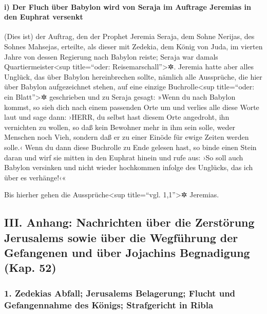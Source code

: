 \hypertarget{i-der-fluch-uxfcber-babylon-wird-von-seraja-im-auftrage-jeremias-in-den-euphrat-versenkt}{%
\paragraph{i) Der Fluch über Babylon wird von Seraja im Auftrage
Jeremias in den Euphrat
versenkt}\label{i-der-fluch-uxfcber-babylon-wird-von-seraja-im-auftrage-jeremias-in-den-euphrat-versenkt}}

(Dies ist) der Auftrag, den der Prophet Jeremia Seraja,
dem Sohne Nerijas, des Sohnes Mahsejas, erteilte, als dieser mit
Zedekia, dem König von Juda, im vierten Jahre von dessen Regierung nach
Babylon reiste; Seraja war damals Quartiermeister\textless sup
title=``oder: Reisemarschall''\textgreater✲. Jeremia
hatte aber alles Unglück, das über Babylon hereinbrechen sollte, nämlich
alle Aussprüche, die hier über Babylon aufgezeichnet stehen, auf eine
einzige Buchrolle\textless sup title=``oder: ein Blatt''\textgreater✲
geschrieben und zu Seraja gesagt: »Wenn du nach Babylon
kommst, so sieh dich nach einem passenden Orte um und verlies alle diese
Worte laut und sage dann: ›HERR, du selbst hast diesem
Orte angedroht, ihn vernichten zu wollen, so daß kein Bewohner mehr in
ihm sein solle, weder Menschen noch Vieh, sondern daß er zu einer Einöde
für ewige Zeiten werden solle.‹ Wenn du dann diese
Buchrolle zu Ende gelesen hast, so binde einen Stein daran und wirf sie
mitten in den Euphrat hinein und rufe aus: ›So soll auch
Babylon versinken und nicht wieder hochkommen infolge des Unglücks, das
ich über es verhänge!‹«

Bis hierher gehen die Aussprüche\textless sup title=``vgl.
1,1''\textgreater✲ Jeremias.

\hypertarget{iii.-anhang-nachrichten-uxfcber-die-zerstuxf6rung-jerusalems-sowie-uxfcber-die-wegfuxfchrung-der-gefangenen-und-uxfcber-jojachins-begnadigung-kap.-52}{%
\subsection{III. Anhang: Nachrichten über die Zerstörung Jerusalems
sowie über die Wegführung der Gefangenen und über Jojachins Begnadigung
(Kap.
52)}\label{iii.-anhang-nachrichten-uxfcber-die-zerstuxf6rung-jerusalems-sowie-uxfcber-die-wegfuxfchrung-der-gefangenen-und-uxfcber-jojachins-begnadigung-kap.-52}}

\hypertarget{zedekias-abfall-jerusalems-belagerung-flucht-und-gefangennahme-des-kuxf6nigs-strafgericht-in-ribla}{%
\subsubsection{1. Zedekias Abfall; Jerusalems Belagerung; Flucht und
Gefangennahme des Königs; Strafgericht in
Ribla}\label{zedekias-abfall-jerusalems-belagerung-flucht-und-gefangennahme-des-kuxf6nigs-strafgericht-in-ribla}}

